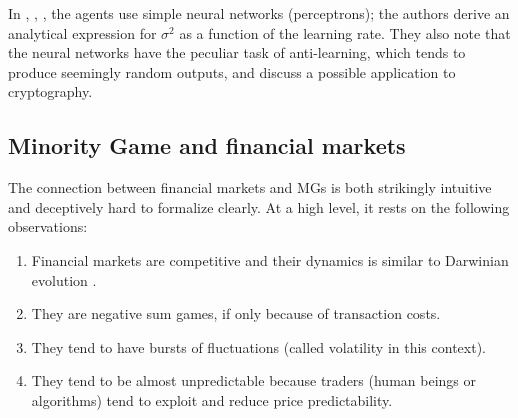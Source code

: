 \documentclass[aps,twocolumn,nofootinbib,sortedaddress,reprint]{revtex4-1}
\begin{document}
In \textcite{Kinzel}, \textcite{Kinzel2}, \textcite{kinzel2002interacting}, the agents use
simple neural networks (perceptrons); the authors derive an analytical
expression for $\sigma^2$ as a function of the learning rate. They
also note that the neural networks have the peculiar task
of anti-learning, which tends to produce seemingly random outputs,
and discuss a possible application to cryptography.


%

\subsection{Minority Game and financial markets}
\label{sec:mg_markets}



The connection between financial markets and MGs is both strikingly
intuitive and deceptively hard to formalize clearly. At a high level,
it rests on the following observations:
\begin{enumerate}
\item Financial markets are competitive and their dynamics is similar
  to Darwinian evolution \cite{ZMEM,FarmerForce,lo2004adaptive}.
\item They are negative sum games, if only because of transaction
  costs.
\item They tend to have bursts of fluctuations (called volatility in
  this context).
\item They tend to be almost unpredictable because traders (human beings or algorithms)  tend to exploit and reduce price predictability.
\end{enumerate}
\end{document}
